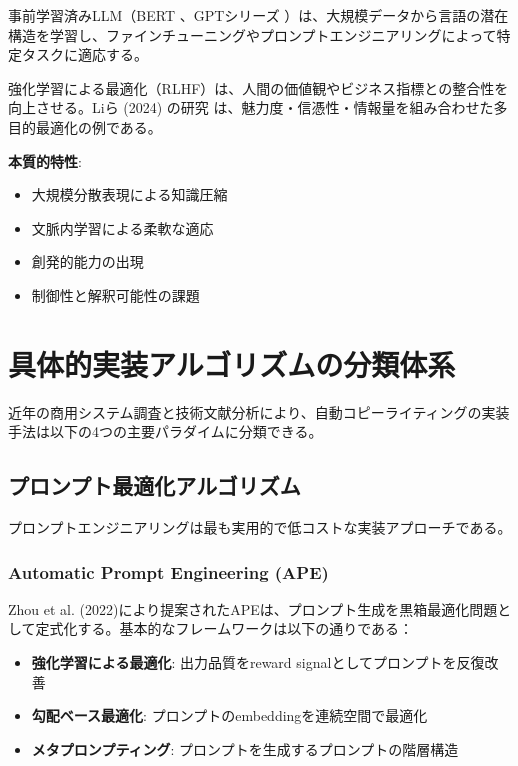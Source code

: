 \documentclass[11pt, a4paper]{article}
\begin{document}
事前学習済みLLM（BERT \cite{DevlinEtAl2019BERTPretraining}、GPTシリーズ \cite{RadfordEtAl2018ImprovingLanguage, RadfordEtAl2019LanguageModels, BrownEtAl2020LanguageModels}）は、大規模データから言語の潜在構造を学習し、ファインチューニングやプロンプトエンジニアリングによって特定タスクに適応する。

強化学習による最適化（RLHF）は、人間の価値観やビジネス指標との整合性を向上させる。Liら (2024) の研究 \cite{LiEtAl2024GeneratingAttractive} は、魅力度・信憑性・情報量を組み合わせた多目的最適化の例である。

\textbf{本質的特性}:
\begin{itemize}[noitemsep,topsep=0pt]
    \item 大規模分散表現による知識圧縮
    \item 文脈内学習による柔軟な適応
    \item 創発的能力の出現
    \item 制御性と解釈可能性の課題
\end{itemize}

\section{具体的実装アルゴリズムの分類体系}

近年の商用システム調査と技術文献分析により、自動コピーライティングの実装手法は以下の4つの主要パラダイムに分類できる。

\subsection{プロンプト最適化アルゴリズム}

プロンプトエンジニアリングは最も実用的で低コストな実装アプローチである。

\subsubsection{Automatic Prompt Engineering (APE)}

Zhou et al. (2022)により提案されたAPEは、プロンプト生成を黒箱最適化問題として定式化する。基本的なフレームワークは以下の通りである：

\begin{itemize}[noitemsep,topsep=0pt]
    \item \textbf{強化学習による最適化}: 出力品質をreward signalとしてプロンプトを反復改善
    \item \textbf{勾配ベース最適化}: プロンプトのembeddingを連続空間で最適化
    \item \textbf{メタプロンプティング}: プロンプトを生成するプロンプトの階層構造
\end{itemize}
\end{document}
